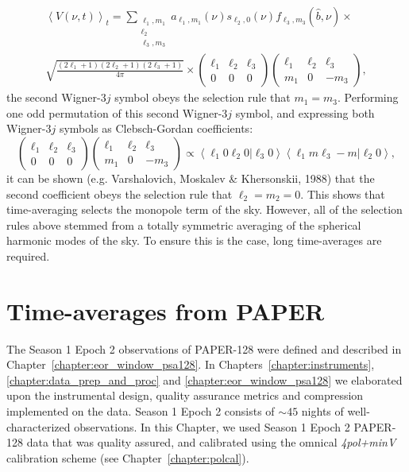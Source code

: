 \begin{multline}
\left\langle V(\nu, t) \right\rangle_t = 
\sum_{\substack{\ell_1, m_1 \\ \ell_2 \\ \ell_3, m_3}} a_{\ell_1, m_1} (\nu) s_{\ell_2, 0} (\nu) f_{\ell_3, m_3} (\hat{b}, \nu) \times \\
\sqrt{\frac{(2\ell_1 + 1)(2\ell_2 + 1)(2\ell_3 + 1)}{4\pi}}
\times \begin{pmatrix}
\ell_1 & \ell_2 & \ell_3 \\
0 & 0 & 0
\end{pmatrix}
\begin{pmatrix}
\ell_1 & \ell_2 & \ell_3 \\
m_1 & 0 & -m_3
\end{pmatrix},
\end{multline}
the second Wigner-3$j$ symbol obeys the selection rule that $m_1 = m_3$. 
Performing one odd permutation of this second Wigner-3$j$ symbol, and expressing both Wigner-3$j$ symbols as Clebsch-Gordan coefficients:
\begin{equation}
\begin{pmatrix}
\ell_1 & \ell_2 & \ell_3 \\
0 & 0 & 0
\end{pmatrix}
\begin{pmatrix}
\ell_1 & \ell_2 & \ell_3 \\
m_1 & 0 & -m_3
\end{pmatrix}
\propto
\left\langle \ell_1 0 \ell_2 0 | \ell_3 0 \right\rangle \left\langle \ell_1 m \ell_3 -m | \ell_2 0 \right\rangle,
\end{equation}
it can be shown (e.g. Varshalovich, Moskalev \& Khersonskii, 1988) that the second coefficient obeys the selection rule that $\ell_2 = m_2 = 0$. This shows that time-averaging selects the monopole term of the sky. However, all of the selection rules above stemmed from a totally symmetric averaging of the spherical harmonic modes of the sky. To ensure this is the case, long time-averages are required.

\section{Time-averages from PAPER}

The Season 1 Epoch 2 observations of PAPER-128 were defined and described in Chapter~\ref{chapter:eor_window_psa128}. In Chapters~\ref{chapter:instruments}, \ref{chapter:data_prep_and_proc} and \ref{chapter:eor_window_psa128} we elaborated upon the instrumental design, quality assurance metrics and compression implemented on the data. Season 1 Epoch 2 consists of $\sim 45$ nights of well-characterized observations. In this Chapter, we used Season 1 Epoch 2 PAPER-128 data that was quality assured, and calibrated using the {\sc omnical} \citep{Zheng.14} \textit{4pol+minV} calibration scheme (see Chapter~\ref{chapter:polcal}). 

